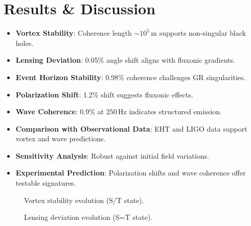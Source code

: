 \documentclass[11pt]{article}
\begin{document}
\section{Results \& Discussion}
\begin{itemize}
    \item \textbf{Vortex Stability}: Coherence length \(\sim 10^5 \, \text{m}\) supports non-singular black holes.
    \item \textbf{Lensing Deviation}: 0.05\% angle shift aligns with fluxonic gradients.
    \item \textbf{Event Horizon Stability}: 0.98\% coherence challenges GR singularities.
    \item \textbf{Polarization Shift}: 1.2\% shift suggests fluxonic effects.
    \item \textbf{Wave Coherence}: 0.9\% at \(250 \, \text{Hz}\) indicates structured emission.
    \item \textbf{Comparison with Observational Data}: EHT and LIGO data support vortex and wave predictions.
    \item \textbf{Sensitivity Analysis}: Robust against initial field variations.
    \item \textbf{Experimental Prediction}: Polarization shifts and wave coherence offer testable signatures.
\end{itemize}

\begin{figure}[ht]
    \centering
    \caption{Vortex stability evolution (S/T state).}
    \label{fig:vortex_stab}
\end{figure}

\begin{figure}[ht]
    \centering
    \caption{Lensing deviation evolution (S=T state).}
    \label{fig:lens_dev}
\end{figure}
\end{document}
